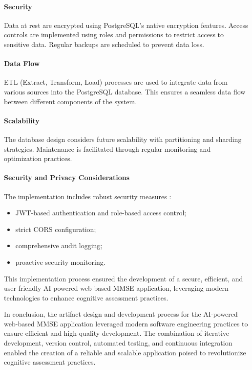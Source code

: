 \paragraph{Security}
Data at rest are encrypted using PostgreSQL's native encryption features. Access controls are implemented using roles and permissions to restrict access to sensitive data. Regular backups are scheduled to prevent data loss.

\paragraph{Data Flow}
ETL (Extract, Transform, Load) processes are used to integrate data from various sources into the PostgreSQL database. This ensures a seamless data flow between different components of the system.

\paragraph{Scalability}
The database design considers future scalability with partitioning and sharding strategies. Maintenance is facilitated through regular monitoring and optimization practices.

\paragraph{Security and Privacy Considerations}
The implementation includes robust security measures \cite{owasp2021top10}:
\begin{itemize}
\item JWT-based authentication and role-based access control;
\item strict CORS configuration;
\item comprehensive audit logging;
\item proactive security monitoring.
\end{itemize}

This implementation process ensured the development of a secure, efficient, and user-friendly AI-powered web-based MMSE application, leveraging modern technologies to enhance cognitive assessment practices.

In conclusion, the artifact design and development process for the AI-powered web-based MMSE application leveraged modern software engineering practices to ensure efficient and high-quality development. The combination of iterative development, version control, automated testing, and continuous integration enabled the creation of a reliable and scalable application poised to revolutionize cognitive assessment practices.

